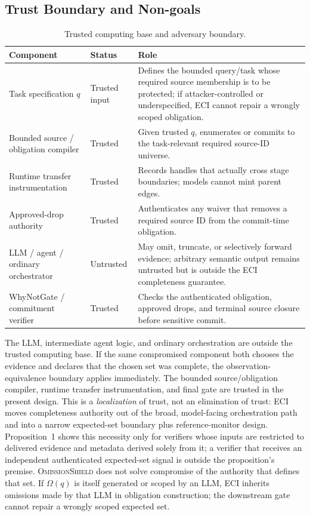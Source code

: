 \documentclass[journal,compsoc]{IEEEtran}
\newcommand{\system}{\textsc{OmissionShield}}
\begin{document}
\subsection{Trust Boundary and Non-goals}
\begin{table}[t]
\centering
\caption{Trusted computing base and adversary boundary.}
\label{tab:tcb}
\small
\begin{tabular}{p{}p{}p{}}
\toprule
Component & Status & Role \\
\midrule
Task specification $q$ & Trusted input & Defines the bounded query/task whose required source membership is to be protected; if attacker-controlled or underspecified, ECI cannot repair a wrongly scoped obligation. \\
Bounded source / obligation compiler & Trusted & Given trusted $q$, enumerates or commits to the task-relevant required source-ID universe. \\
Runtime transfer instrumentation & Trusted & Records handles that actually cross stage boundaries; models cannot mint parent edges. \\
Approved-drop authority & Trusted & Authenticates any waiver that removes a required source ID from the commit-time obligation. \\
LLM / agent / ordinary orchestrator & Untrusted & May omit, truncate, or selectively forward evidence; arbitrary semantic output remains untrusted but is outside the ECI completeness guarantee. \\
WhyNotGate / commitment verifier & Trusted & Checks the authenticated obligation, approved drops, and terminal source closure before sensitive commit. \\
\bottomrule
\end{tabular}
\end{table}

The LLM, intermediate agent logic, and ordinary orchestration are outside the trusted computing base. If the same compromised component both chooses the evidence and declares that the chosen set was complete, the observation-equivalence boundary applies immediately. The bounded source/obligation compiler, runtime transfer instrumentation, and final gate are trusted in the present design. This is a \emph{localization} of trust, not an elimination of trust: ECI moves completeness authority out of the broad, model-facing orchestration path and into a narrow expected-set boundary plus reference-monitor design. Proposition~1 shows this necessity only for verifiers whose inputs are restricted to delivered evidence and metadata derived solely from it; a verifier that receives an independent authenticated expected-set signal is outside the proposition's premise. \system{} does not solve compromise of the authority that defines that set. If $\Omega(q)$ is itself generated or scoped by an LLM, ECI inherits omissions made by that LLM in obligation construction; the downstream gate cannot repair a wrongly scoped expected set.
\end{document}
